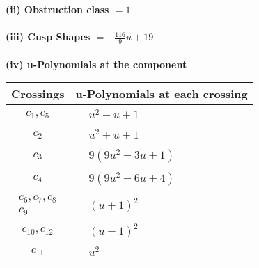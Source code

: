 \documentclass[1p]{elsarticle_modified}
\theoremstyle{definition}
\begin{document}
\flushleft \textbf{(ii) Obstruction class $= 1$}\\~\\
\flushleft \textbf{(iii) Cusp Shapes $= -\frac{116}{9} u+19$}\\~\\
\newpage\renewcommand{\arraystretch}{1}
\flushleft \textbf{(iv) u-Polynomials at the component}\newline \\
\begin{tabular}{m{50pt}|m{274pt}}
Crossings & \hspace{64pt}u-Polynomials at each crossing \\
\hline $$\begin{aligned}c_{1},c_{5}\end{aligned}$$&$\begin{aligned}
&u^2- u+1
\end{aligned}$\\
\hline $$\begin{aligned}c_{2}\end{aligned}$$&$\begin{aligned}
&u^2+u+1
\end{aligned}$\\
\hline $$\begin{aligned}c_{3}\end{aligned}$$&$\begin{aligned}
&9(9 u^2-3 u+1)
\end{aligned}$\\
\hline $$\begin{aligned}c_{4}\end{aligned}$$&$\begin{aligned}
&9(9 u^2-6 u+4)
\end{aligned}$\\
\hline $$\begin{aligned}c_{6},c_{7},c_{8}\\c_{9}\end{aligned}$$&$\begin{aligned}
&(u+1)^2
\end{aligned}$\\
\hline $$\begin{aligned}c_{10},c_{12}\end{aligned}$$&$\begin{aligned}
&(u-1)^2
\end{aligned}$\\
\hline $$\begin{aligned}c_{11}\end{aligned}$$&$\begin{aligned}
&u^2
\end{aligned}$\\
\hline
\end{tabular}\\~\\
\end{document}
